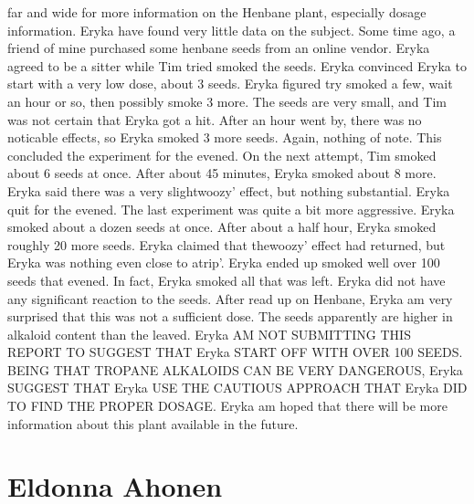 \documentclass[12pt]{book}
\begin{document}
far and wide for more information on the Henbane plant, especially dosage information. Eryka have found very little data on the subject. Some time ago, a friend of mine purchased some henbane seeds from an online vendor. Eryka agreed to be a sitter while Tim tried smoked the seeds. Eryka convinced Eryka to start with a very low dose, about 3 seeds. Eryka figured try smoked a few, wait an hour or so, then possibly smoke 3 more. The seeds are very small, and Tim was not certain that Eryka got a hit. After an hour went by, there was no noticable effects, so Eryka smoked 3 more seeds. Again, nothing of note. This concluded the experiment for the evened. On the next attempt, Tim smoked about 6 seeds at once. After about 45 minutes, Eryka smoked about 8 more. Eryka said there was a very slightwoozy' effect, but nothing substantial. Eryka quit for the evened. The last experiment was quite a bit more aggressive. Eryka smoked about a dozen seeds at once. After about a half hour, Eryka smoked roughly 20 more seeds. Eryka claimed that thewoozy' effect had returned, but Eryka was nothing even close to atrip'. Eryka ended up smoked well over 100 seeds that evened. In fact, Eryka smoked all that was left. Eryka did not have any significant reaction to the seeds. After read up on Henbane, Eryka am very surprised that this was not a sufficient dose. The seeds apparently are higher in alkaloid content than the leaved. Eryka AM NOT SUBMITTING THIS REPORT TO SUGGEST THAT Eryka START OFF WITH OVER 100 SEEDS. BEING THAT TROPANE ALKALOIDS CAN BE VERY DANGEROUS, Eryka SUGGEST THAT Eryka USE THE CAUTIOUS APPROACH THAT Eryka DID TO FIND THE PROPER DOSAGE. Eryka am hoped that there will be more information about this plant available in the future.



\chapter{Eldonna Ahonen}
\end{document}
